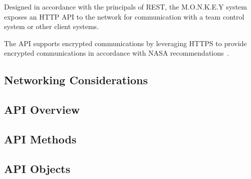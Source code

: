 Designed in accordance with the principals of REST, the M.O.N.K.E.Y system exposes an HTTP API to
the network for communication with a team control system or other client systems.

The API supports encrypted communications by leveraging HTTPS to provide encrypted communications
in accordance with NASA recommendations~\cite[p.~30]{nasa-comp-2021}.

\subsection{Networking Considerations}\label{subsec:networking-considerations}

\subsection{API Overview}\label{subsec:api-overview}

\subsection{API Methods}\label{subsec:api-methods}

\subsection{API Objects}\label{subsec:api-objects}
